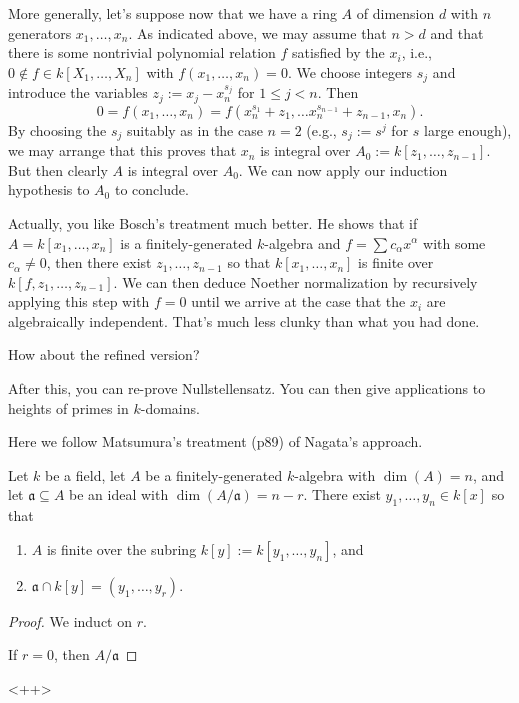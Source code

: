 \documentclass[reqno]{amsart}
\begin{document}
More generally,
let's suppose now that we have
a ring \(A\) of dimension \(d\)
with \(n\) generators \(x_1,\dotsc,x_n\).
As indicated above,
we may assume that \(n > d\)
and that there is some nontrivial polynomial relation
\(f\) satisfied by the \(x_i\),
i.e.,
\(0 \notin f \in k[X_1,\dotsc,X_n]\)
with \(f(x_1,\dotsc,x_n) = 0\).
We choose integers \(s_j\) and introduce the variables
\(z_j := x_j - x_n^{s_j}\) for \(1 \leq j < n\).
Then
\[
    0 = f(x_1,\dotsc,x_n)
    =
    f(x_n^{s_1} + z_1,
    \dotsc
    x_n^{s_{n-1}} + z_{n-1},
    x_n).
  \]
By choosing the \(s_j\) suitably
as in the case \(n = 2\) (e.g.,
\(s_j := s^j\) for \(s\) large enough),
we may arrange that this proves
that
\(x_n\) is integral
over \(A_0 := k[z_1,\dotsc,z_{n-1}]\).
But then clearly \(A\) is integral over \(A_0\).
We can now apply our induction hypothesis to \(A_0\) to conclude.

Actually, you like Bosch's treatment much better.
He shows that if \(A = k[x_1,\dotsc,x_n]\) is a finitely-generated
$k$-algebra
and \(f = \sum c_\alpha x^\alpha\)
with some \(c_\alpha \neq 0\),
then there exist \(z_1,\dotsc,z_{n-1}\)
so that \(k[x_1,\dotsc,x_n]\)
is finite over \(k[f,z_1,\dotsc,z_{n-1}]\).
We can then deduce Noether normalization
by recursively applying this step 
with \(f = 0\)
until we arrive at the case
that the \(x_i\) are algebraically independent.
That's much less clunky than what you had done.


How about the refined version?


After this, you can re-prove Nullstellensatz.
You can then give applications
to heights of primes in $k$-domains.


Here we follow Matsumura's treatment (p89)
of Nagata's approach.

\begin{theorem}
  Let $k$ be a field, let $A$ be a finitely-generated
  $k$-algebra with $\dim(A) = n$,
  and let $\mathfrak{a} \subseteq A$ be an ideal
  with $\dim(A/\mathfrak{a}) = n-r$.
  There exist $y_1,\dotsc,y_n \in k[x]$
  so that
  \begin{enumerate}
  \item $A$ is finite over the subring $k[y] := k[y_1,\dotsc,y_n]$, and
  \item $\mathfrak{a} \cap k[y] = (y_1,\dotsc,y_r)$.
  \end{enumerate}
\end{theorem}
\begin{proof}
  We induct on $r$.

  If $r = 0$,
  then $A/\mathfrak{a}$
\end{proof}<++>
\end{document}
